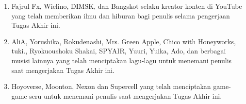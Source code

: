 \begin{enumerate}
  \item Fajrul Fx, Wielino, DIMSK, dan Bangskot selaku kreator konten di YouTube yang telah memberikan ilmu dan hiburan bagi penulis selama pengerjaan Tugas Akhir ini.
  \item AliA, Yorushika, Rokudenashi, Mrs. Green Apple, Chico with Honeyworks, tuki., Ryokuoushoku Shakai, SPYAIR, Yuuri, Yuika, Ado, dan berbagai musisi lainnya yang telah menciptakan lagu-lagu untuk menemani penulis saat mengerjakan Tugas Akhir ini.
  \item Hoyoverse, Moonton, Nexon dan Supercell yang telah menciptakan game-game seru untuk menemani penulis saat mengerjakan Tugas Akhir ini.
\end{enumerate}